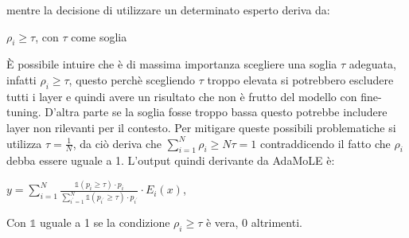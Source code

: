         mentre la decisione di utilizzare un determinato esperto deriva da:\\ \centerline{$\rho_i \geq \tau$, con $\tau$ come soglia}\newline
        È possibile intuire che è di massima importanza scegliere una soglia $\tau$ adeguata, infatti $\rho_i \geq \tau$, questo perchè scegliendo $\tau$ troppo elevata si potrebbero escludere tutti i layer e quindi avere un risultato che non è frutto del modello con \gls{fine-tuning}.
        D'altra parte se la soglia fosse troppo bassa questo potrebbe includere layer non rilevanti per il contesto.
        Per mitigare queste possibili problematiche si utilizza $\tau = \frac{1}{N}$, da ciò deriva che $\sum_{i=1}^N\rho_i \geq N\tau = 1$ contraddicendo il fatto che $\rho_i$ debba essere uguale a 1.
        L'output quindi derivante da AdaMoLE è:\\
        \centerline{$y=\sum_{i=1}^N \frac{\mathds{1}\left(p_i \geq \tau\right) \cdot p_i}{\sum_{i^{\prime}=1}^N \mathds{1}\left(p_{i^{\prime}} \geq \tau\right) \cdot p_{i^{\prime}}} \cdot E_i(x)$,}
        Con $\mathds{1}$ uguale a 1 se la condizione $\rho_i \geq \tau$ è vera, 0 altrimenti.

